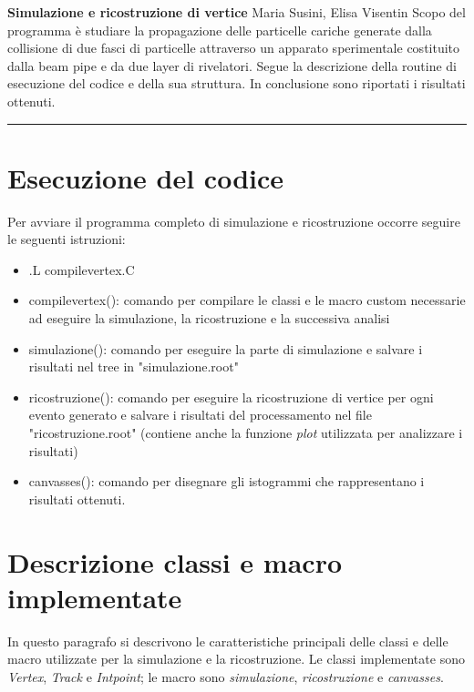 \documentclass{article}
\begin{document}
\noindent\Huge\textmd{\textbf{Simulazione e ricostruzione di vertice}}
\newline\noindent\large Maria Susini, Elisa Visentin 
\newline\newline\noindent
Scopo del programma è studiare la propagazione delle particelle cariche generate dalla collisione di due fasci di particelle attraverso un apparato sperimentale costituito dalla beam pipe e da due layer di rivelatori. Segue la descrizione della routine di esecuzione del codice e della sua struttura. In conclusione sono riportati i risultati ottenuti.
\newline\noindent\rule{17cm}{0.1pt}
\section{Esecuzione del codice}
Per avviare il programma completo di simulazione e ricostruzione occorre seguire le seguenti istruzioni:
\begin{itemize}
	\item .L compilevertex.C
	\item compilevertex(): comando per compilare le classi e le macro custom necessarie ad eseguire la simulazione, la ricostruzione e la successiva analisi
	\item simulazione(): comando per eseguire la parte di simulazione e salvare i risultati nel tree in "simulazione.root"
	\item ricostruzione(): comando per eseguire la ricostruzione di vertice per ogni evento generato e salvare i risultati del processamento nel file "ricostruzione.root" (contiene anche la funzione \textit{plot} utilizzata per analizzare i risultati)
	\item canvasses(): comando per disegnare gli istogrammi che rappresentano i risultati ottenuti. 
\end{itemize}


\section{Descrizione classi e macro implementate}
In questo paragrafo si descrivono le caratteristiche principali delle classi e delle macro utilizzate per la simulazione e la ricostruzione. Le classi implementate sono \textit{Vertex}, \textit{Track} e \textit{Intpoint}; le macro sono \textit{simulazione}, \textit{ricostruzione} e \textit{canvasses}.
\end{document}
